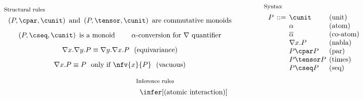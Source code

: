 \documentclass[UKenglish,acmsmall,authorversion]{acmart}
\theoremstyle{plain}
\begin{document}


\begin{figure}
 \begin{center}
\[
\begin{array}{l}
\mbox{\footnotesize Structural rules}
\\[4pt]
\begin{tabular}{c}
$\left(P, \cpar, \cunit\right)\mbox{ and }\left(P, \tensor, \cunit\right)\mbox{ are commutative monoids}$
\\[9pt]
$\left(P, \cseq, \cunit\right)\mbox{ is a monoid}$
\qquad
\mbox{$\alpha$-conversion for $\nabla$ quantifier}
\\[9pt]
$\nabla x .\nabla y. P \equiv \nabla y .\nabla x. P
~~\mbox{(equivariance)}$
\\[9pt]
$\nabla x . P \equiv P
~~\mbox{only if $\nfv{x}{P}$}
~~\mbox{(vacuous)}$
\end{tabular}
\end{array}
\qquad\quad
\begin{array}{l}
\mbox{\footnotesize Syntax}
\\[4pt]
\begin{tabular}{l@{\hspace{1ex}}l@{\hspace{1ex}}l@{\hspace{1ex}}l}
$P$&$::=$ & $\cunit$ & (unit)\\
&& $\alpha$ & (atom)\\
&& $\overline{\alpha}$ & (co-atom)\\
&& $\nabla{x}. P$ & (nabla)\\
&& $P \cpar P$ & (par)\\
&& $P \tensor P$ & (times)\\
&& $P \cseq P$ & (seq)
\end{tabular}
\end{array}
\]
\[
\begin{array}{l}
\mbox{\footnotesize Inference rules}
\\[4pt]
\begin{array}{c}
\infer[\mbox{(atomic interaction)}]{
}
\end{array}
\end{array}\]
\end{center}
\end{figure}
\end{document}
